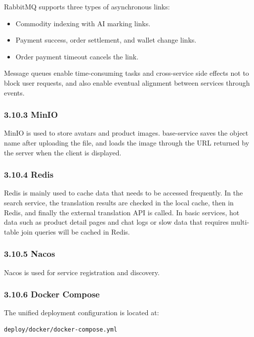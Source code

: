\documentclass{article}
\begin{document}
RabbitMQ supports three types of asynchronous links:

\begin{itemize}
    \item Commodity indexing with AI marking links.
    \item Payment success, order settlement, and wallet change links.
    \item Order payment timeout cancels the link.
\end{itemize}

Message queues enable time-consuming tasks and cross-service side effects not to block user requests, and also enable eventual alignment between services through events.

\subsubsection{3.10.3 MinIO}

MinIO is used to store avatars and product images. base-service saves the object name after uploading the file, and loads the image through the URL returned by the server when the client is displayed.

\subsubsection{3.10.4 Redis}

Redis is mainly used to cache data that needs to be accessed frequently. In the search service, the translation results are checked in the local cache, then in Redis, and finally the external translation API is called. In basic services, hot data such as product detail pages and chat logs or slow data that requires multi-table join queries will be cached in Redis.

\subsubsection{3.10.5 Nacos}

Nacos is used for service registration and discovery.

\subsubsection{3.10.6 Docker Compose}

The unified deployment configuration is located at:

\begin{verbatim}
deploy/docker/docker-compose.yml
\end{verbatim}
\end{document}
